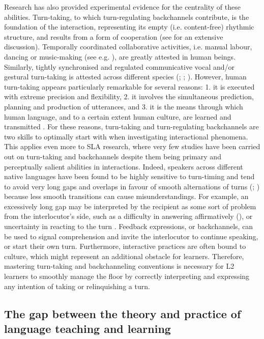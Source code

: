 Research has also provided experimental evidence for the centrality of these abilities. Turn-taking, to which turn-regulating backchannels contribute, is the foundation of the interaction, representing its empty (i.e. content-free) rhythmic structure, and results from a form of cooperation (see \citealt{Wehrle2023} for an extensive discussion). Temporally coordinated collaborative activities, i.e. manual labour, dancing or music-making (see e.g. \citealt{HawkinsEtAl2013}), are greatly attested in human beings. Similarly, tightly synchronised and regulated communicative vocal and/or gestural turn-taking is attested across different species (\citealt{PikaEtAl2018}; \citealt{RavignaniEtAl2019}; \citealt{TakahashiEtAl2016}). However, human turn-taking appears particularly remarkable for several reasons: 1. it is executed with extreme precision and flexibility, 2. it involves the simultaneous prediction, planning and production of utterances, and 3. it is the means through which human language, and to a certain extent human culture, are learned and transmitted \citep{Schegloff2006}. For these reasons, turn-taking and turn-regulating backchannels are two skills to optimally start with when investigating interactional phenomena. This applies even more to SLA research, where very few studies have been carried out on turn-taking and backchannels despite them being primary and perceptually salient abilities in interactions. Indeed, speakers across different native languages have been found to be highly sensitive to turn-timing and tend to avoid very long gaps and overlaps in favour of smooth alternations of turns (\citealt{LevinsonTorreira2015}; \citealt{StiversEtAl2009}) because less smooth transitions can cause misunderstandings. For example, an excessively long gap may be interpreted by the recipient as some sort of problem from the interlocutor’s side, such as a difficulty in answering affirmatively (\citealt{RobertsEtAl2011}), or uncertainty in reacting to the turn \citep{Levinson1983}. Feedback expressions, or backchannels, can be used to signal comprehension and invite the interlocutor to continue speaking, or start their own turn. Furthermore, interactive practices are often bound to culture, which might represent an additional obstacle for learners. Therefore, mastering turn-taking and backchanneling conventions is necessary for L2 learners to smoothly manage the floor by correctly interpreting and expressing any intention of taking or relinquishing a turn.

\subsection{The gap between the theory and practice of language teaching and learning}
\label{sec:1.1.3}
\largerpage

